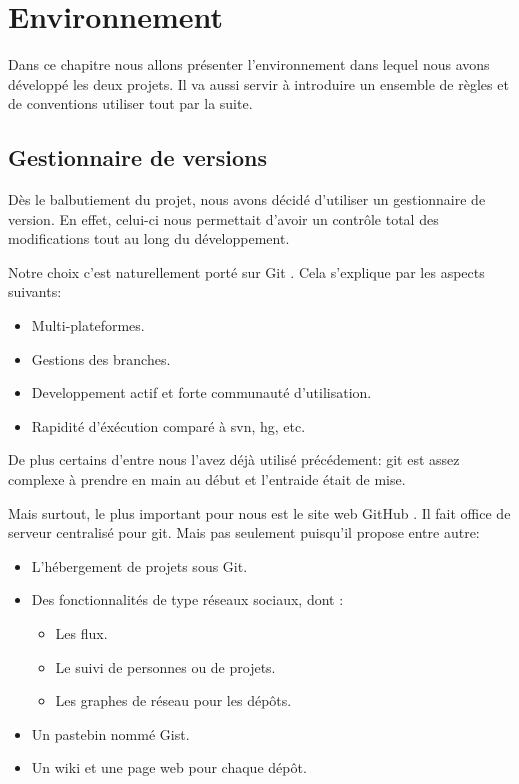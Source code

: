 \chapter{Environnement}
    Dans ce chapitre nous allons présenter l'environnement dans lequel nous avons
    développé les deux projets. Il va aussi servir à introduire un ensemble de
    règles et de conventions utiliser tout par la suite.

\newpage

    \section{Gestionnaire de versions}
        Dès le balbutiement du projet, nous avons décidé d'utiliser un gestionnaire
    de version. En effet, celui-ci nous permettait d'avoir un contrôle total des modifications
    tout au long du développement.

    Notre choix c'est naturellement porté sur Git \cite{git}. Cela s'explique 
    par les aspects suivants:

    \begin{itemize}
    \item Multi-plateformes.
    \item Gestions des branches.
    \item Developpement actif et forte communauté d'utilisation.
    \item Rapidité d'éxécution comparé à svn, hg, etc. 
    \end{itemize}

    De plus certains d'entre nous l'avez déjà utilisé précédement: git est assez
    complexe à prendre en main au début et l'entraide était de mise.

    Mais surtout, le plus important pour nous est le site web GitHub \cite{github}.
    Il fait office de serveur centralisé pour git. Mais pas seulement puisqu'il 
    propose entre autre:

    \begin{itemize}
    \item L'hébergement de projets sous Git.
    \item Des fonctionnalités de type réseaux sociaux, dont :
        \begin{itemize}
        \item Les flux.
        \item Le suivi de personnes ou de projets.
        \item Les graphes de réseau pour les dépôts.
        \end{itemize}
    \item Un pastebin nommé Gist.
    \item Un wiki et une page web pour chaque dépôt.
    \end{itemize}

